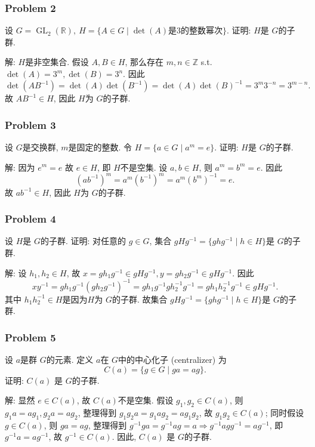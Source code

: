 \documentclass[a4paper,12pt]{ctexart}
\newcommand{\Z}{\mathbb{Z}}
\newcommand{\R}{\mathbb{R}}
\begin{document}
\subsubsection*{Problem 2} 
  设 $ G=\operatorname{GL}_2(\R),~H=\{A\in G\mid\det(A)\text{是3的整数幂次}\} $. 证明: $ H $是 $ G $的子群.
  
  解: $ H $是非空集合. 假设 $ A,B\in H $, 那么存在 $ m,n\in\Z $ s.t. $ \det(A)=3^m,\det(B)=3^n $. 因此
  \[\det(AB^{-1})=\det(A)\det(B^{-1})=\det(A)\det(B)^{-1}=3^m3^{-n}=3^{m-n}.\]
  故 $ AB^{-1}\in H $, 因此 $ H $为 $ G $的子群.

\subsubsection*{Problem 3}
  设 $ G $是交换群, $ m $是固定的整数. 令 $ H=\{a\in G\mid a^m=e\} $. 证明: $ H $是 $ G $的子群.    

  解: 因为 $ e^m=e $ 故 $ e\in H $, 即 $ H $不是空集. 设 $ a,b\in H $, 则 $ a^m=b^m=e $. 因此
  \[(ab^{-1})^m=a^m(b^{-1})^m=a^m(b^m)^{-1}=e.\]
  故 $ ab^{-1}\in H $, 因此 $ H $为 $ G $的子群.

\subsubsection*{Problem 4}
  设 $ H $是 $ G $的子群. 证明: 对任意的 $ g\in G $, 集合 $ gHg^{-1}=\{ghg^{-1}\mid h\in H\} $是 $ G $的子群.

  解: 设 $ h_1,h_2\in H $, 故 $ x=gh_1g^{-1}\in gHg^{-1},y=gh_2g^{-1}\in gHg^{-1} $. 因此
  \[xy^{-1}=gh_1g^{-1}(gh_2g^{-1})^{-1}=gh_1g^{-1}gh_2^{-1}g^{-1}=gh_1h_2^{-1}g^{-1}\in gHg^{-1}.\]
  其中 $ h_1h_2^{-1}\in H $是因为$ H $为 $ G $的子群. 故集合 $ gHg^{-1}=\{ghg^{-1}\mid h\in H\} $是 $ G $的子群.

\subsubsection*{Problem 5}
  设 $ a $是群 $ G $的元素. 定义 $ a $在 $ G $中的中心化子 (centralizer) 为 
  \[C(a)=\{g\in G\mid ga=ag\}.\]
  证明: $ C(a) $ 是 $ G $的子群.

  解: 显然 $ e\in C(a) $, 故 $ C(a) $不是空集. 假设 $ g_1,g_2\in C(a) $, 则 $ g_1a=ag_1,g_2a=ag_2 $, 整理得到
  $ g_1g_2a=g_1ag_2=ag_1g_2 $, 故 $ g_1g_2\in C(a) $; 同时假设 $ g\in C(a) $, 则  $ ga=ag $, 整理得到 
  $ g^{-1}ga=g^{-1}ag=a\Rightarrow g^{-1}agg^{-1}=ag^{-1} $, 即 $ g^{-1}a=ag^{-1} $, 故 $ g^{-1}\in C(a) $.
  因此, $ C(a) $ 是 $ G $的子群.
\end{document}
